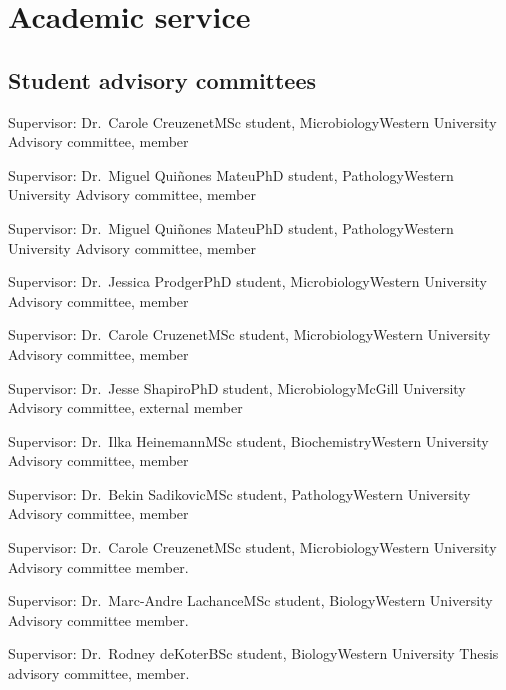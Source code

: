 \section {Academic service}

\subsection {Student advisory committees}

{Supervisor: Dr.~Carole Creuzenet}{MSc student, Microbiology}{Western University}
{Advisory committee, member}

{Supervisor: Dr.~Miguel Qui\~nones Mateu}{PhD student, Pathology}{Western University}
{Advisory committee, member}

{Supervisor: Dr.~Miguel Qui\~nones Mateu}{PhD student, Pathology}{Western University}
{Advisory committee, member}

{Supervisor: Dr.~Jessica Prodger}{PhD student, Microbiology}{Western University}
{Advisory committee, member}

{Supervisor: Dr.~Carole Cruzenet}{MSc student, Microbiology}{Western University}
{Advisory committee, member}

{Supervisor: Dr.~Jesse Shapiro}{PhD student, Microbiology}{McGill University}
{Advisory committee, external member}


{Supervisor: Dr.~Ilka Heinemann}{MSc student, Biochemistry}{Western University}
{Advisory committee, member}

{Supervisor: Dr.~Bekin Sadikovic}{MSc student, Pathology}{Western University}
{Advisory committee, member}

{Supervisor: Dr.~Carole Creuzenet}{MSc student, Microbiology}{Western University}
{Advisory committee member.}

{Supervisor: Dr.~Marc-Andre Lachance}{MSc student, Biology}{Western University}
{Advisory committee member.}

{Supervisor: Dr.~Rodney deKoter}{BSc student, Biology}{Western University}
{Thesis advisory committee, member.}

